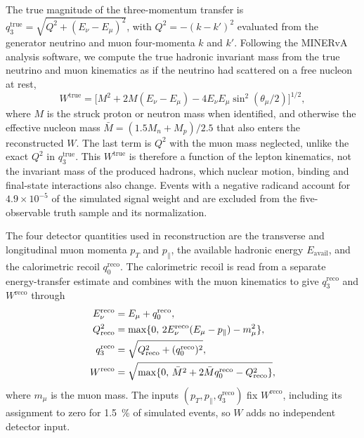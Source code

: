 The true magnitude of the three-momentum transfer is $q_3^{\mathrm{true}}=\sqrt{Q^2+(E_\nu-E_\mu)^2}$, with $Q^2=-(k-k')^2$ evaluated from the generator neutrino and muon four-momenta $k$ and $k'$. \label{sec:eavailw-axis}Following the MINERvA analysis software, we compute the true hadronic invariant mass from the true neutrino and muon kinematics as if the neutrino had scattered on a free nucleon at rest,
%
\begin{equation}
  W^{\mathrm{true}} = \bigl[
    M^2+2M(E_\nu-E_\mu)-4E_\nu E_\mu\sin^2(\theta_\mu/2)
  \bigr]^{1/2},
  \label{eq:hadronic-mass-true}
\end{equation}
where $M$ is the struck proton or neutron mass when identified, and otherwise the effective nucleon mass $\bar M=(1.5M_n+M_p)/2.5$ that also enters the reconstructed $W$. The last term is $Q^2$ with the muon mass neglected, unlike the exact $Q^2$ in $q_3^{\mathrm{true}}$. This $W^{\mathrm{true}}$ is therefore a function of the lepton kinematics, not the invariant mass of the produced hadrons, which nuclear motion, binding and final-state interactions also change. Events with a negative radicand account for $4.9\times10^{-5}$ of the simulated signal weight and are excluded from the five-observable truth sample and its normalization.

The four detector quantities used in reconstruction are the transverse and longitudinal muon momenta $p_T$ and $p_\parallel$, the available hadronic energy $E_{\mathrm{avail}}$, and the calorimetric recoil $q_0^{\mathrm{reco}}$. The calorimetric recoil is read from a separate energy-transfer estimate and combines with the muon kinematics to give $q_3^{\mathrm{reco}}$ and $W^{\mathrm{reco}}$ through
\begin{equation}
  \begin{aligned}[b]
    E_\nu^{\mathrm{reco}} &= E_\mu+q_0^{\mathrm{reco}},\\
    Q^2_{\mathrm{reco}} &=
      \max\{0,\,2E_\nu^{\mathrm{reco}}(E_\mu-p_\parallel)-m_\mu^2\},\\
    q_3^{\mathrm{reco}} &= \sqrt{Q^2_{\mathrm{reco}}+(q_0^{\mathrm{reco}})^2},\\
    W^{\mathrm{reco}} &=
      \sqrt{\max\{0,\,\bar M^2+2\bar M q_0^{\mathrm{reco}}-Q^2_{\mathrm{reco}}\}},
  \end{aligned}
  \label{eq:transfer-mass-reco}
  \csname ltx@label\endcsname{eq:shared-reco-inputs}
\end{equation}
where $m_\mu$ is the muon mass. The inputs $(p_T,p_\parallel,q_3^{\mathrm{reco}})$ fix $W^{\mathrm{reco}}$, including its assignment to zero for \SI{1.5}{\percent} of simulated events, so $W$ adds no independent detector input.

